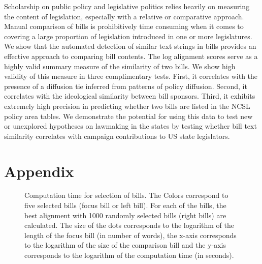 \documentclass[12pt]{article} %
\begin{document}
Scholarship on public policy and legislative politics relies heavily on measuring the content of legislation, especially with a relative or comparative approach. Manual comparison of bills is prohibitively time consuming when it comes to covering a large proportion of legislation introduced in one or more legislatures. We show that the automated detection of similar text strings in bills provides an effective approach to comparing bill contents. The log alignment scores serve as a highly valid summary measure of the similarity of two bills. We show high validity of this measure in three complimentary tests. First, it correlates with the presence of a diffusion tie inferred from patterns of policy diffusion. Second, it correlates with the ideological similarity between bill sponsors. Third, it exhibits extremely high precision in predicting whether two bills are listed in the NCSL policy area tables. We demonstrate the potential for using this data to test new or unexplored hypotheses on lawmaking in the states by testing whether bill text similarity correlates with campaign contributions to US state legislators.

\clearpage





\section*{Appendix}

\begin{figure}[ht!]
\caption{Computation time for selection of bills. The Colors correspond to five selected bills (focus bill or left bill). For each of the bills, the best alignment with 1000 randomly selected bills (right bills) are calculated. The size of the dots corresponds to the logarithm of the length of the focus bill (in number of words), the x-axis corresponds to the logarithm of the size of the comparison bill and the y-axis corresponds to the logarithm of the computation time (in seconds).}
\label{fig:time_size}
\end{figure}
\end{document}

